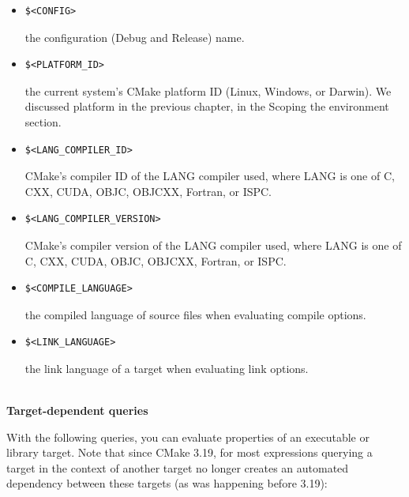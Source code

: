 \begin{itemize}
\item 
\begin{lstlisting}[style=styleCMake]
$<CONFIG> 
\end{lstlisting}

the configuration (Debug and Release) name.

\item 
\begin{lstlisting}[style=styleCMake]
$<PLATFORM_ID>
\end{lstlisting}

the current system's CMake platform ID (Linux, Windows, or Darwin). We discussed platform in the previous chapter, in the Scoping the environment section.

\item 
\begin{lstlisting}[style=styleCMake]
$<LANG_COMPILER_ID> 
\end{lstlisting}

CMake's compiler ID of the LANG compiler used, where LANG is one of C, CXX, CUDA, OBJC, OBJCXX, Fortran, or ISPC.

\item 
\begin{lstlisting}[style=styleCMake]
$<LANG_COMPILER_VERSION> 
\end{lstlisting}

CMake's compiler version of the LANG compiler used, where LANG is one of C, CXX, CUDA, OBJC, OBJCXX, Fortran, or ISPC.

\item 
\begin{lstlisting}[style=styleCMake]
$<COMPILE_LANGUAGE>
\end{lstlisting}

the compiled language of source files when evaluating compile options.

\item 
\begin{lstlisting}[style=styleCMake]
$<LINK_LANGUAGE>
\end{lstlisting}

the link language of a target when evaluating link options.
\end{itemize}

\hspace*{\fill} \\ %
\noindent
\textbf{Target-dependent queries}

With the following queries, you can evaluate properties of an executable or library target. Note that since CMake 3.19, for most expressions querying a target in the context of another target no longer creates an automated dependency between these targets (as was happening before 3.19):

